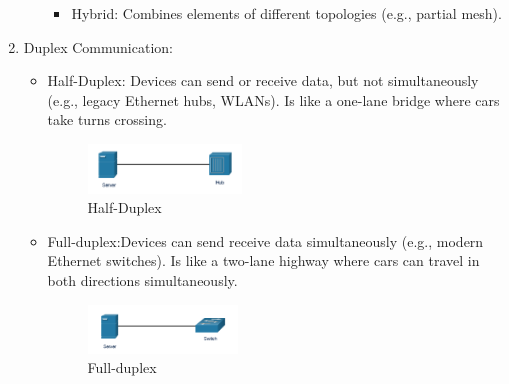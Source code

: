 \documentclass[a4paper,11pt]{article}
\begin{document}
\begin{enumerate}
\begin{itemize}
\begin{itemize}
\begin{figure}[h!]
    \end{figure}
            \item Hybrid: Combines elements of different topologies (e.g., partial mesh).\\
        \end{itemize}
    \end{itemize}
    \item Duplex Communication:\\
    \begin{itemize}
        \item Half-Duplex: Devices can send or receive data, but not simultaneously (e.g., legacy Ethernet hubs, WLANs). Is like a one-lane bridge where cars take turns crossing.\\

    \begin{figure}[h!]
    \centering
    \includegraphics[width=0.41\textwidth]{29.png}
    \caption{Half-Duplex}
    \label{fig:cap1}
    \end{figure}
        
        \item Full-duplex:Devices can send receive data simultaneously (e.g., modern Ethernet switches). Is like a two-lane highway where cars can travel in both directions simultaneously.\\

    \begin{figure}[h!]
    \centering
    \includegraphics[width=0.4\textwidth]{30.png}
    \caption{Full-duplex}
    \label{fig:cap1}
    \end{figure}
        

\end{itemize}
\end{enumerate}
\end{document}
